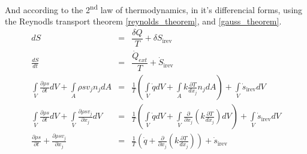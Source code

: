 And according to the 2\textsuperscript{nd} law of thermodynamics, in it's differencial forms, using the Reynodls transport theorem \eqref{reynolds_theorem}, and \eqref{gauss_theorem}.
\begin{eqnarray}
    \label{differential_entropy}
    dS &=& \dfrac{\delta Q}{T} + \delta S_{\text{irev}}\\
    \frac{dS}{dt} &=& \dfrac{\dot{Q}_{ext}}{T} + \dot{S}_{\text{irev}}\\
    \int\limits_V\frac{\partial \rho s}{\partial t} dV +  \int\limits_A \rho s v_j n_j dA &=& \frac{1}{T}\left(\int\limits_V \dot{q} dV + \int\limits_A k\frac{\partial T}{d x_j} n_j dA \right) + \int\limits_V \dot{s}_{\text{irev}} dV\\ 
    \int\limits_V\frac{\partial \rho s}{\partial t} dV +  \int\limits_V \frac{\partial \rho s v_j}{\partial x_j} dV &=& \frac{1}{T}\left(\int\limits_V \dot{q} dV + \int\limits_V \frac{\partial} {\partial x_j} \left( k\frac{\partial T}{d x_j} \right) dV \right) + \int\limits_V \dot{s}_{\text{irev}} dV \\
    \frac{\partial \rho s}{\partial t} +  \frac{\partial \rho s v_j}{\partial x_j} &=& \frac{1}{T}\left(\dot{q} + \frac{\partial} {\partial x_j} \left( k\frac{\partial T}{d x_j} \right) \right) + \dot{s}_{\text{irev}} 
\end{eqnarray}







